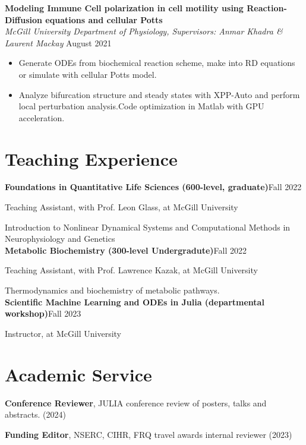 \documentclass{article}
\newcommand{\cvsection}[1]{\section*{\rmfamily#1}}
\begin{document}
\begin{samepage}
\textbf{Modeling Immune Cell polarization in cell motility using Reaction-Diffusion equations and cellular Potts}\\
\indent
\textit{McGill University Department of Physiology, Supervisors: Anmar Khadra \& Laurent Mackay} \hfill August 2021
\begin{itemize}
    \item[] Generate ODEs from biochemical reaction scheme, make into RD equations or simulate with cellular Potts model.
    \item[] Analyze bifurcation structure and steady states with XPP-Auto and perform local perturbation analysis.Code optimization in Matlab with GPU acceleration.
\end{itemize}
\end{samepage}



\cvsection{Teaching Experience}
\indent

\textbf{Foundations in Quantitative Life Sciences (600-level, graduate)}\hfill Fall 2022

\hspace{2em}Teaching Assistant, with Prof. Leon Glass, at McGill University

\hspace{2em}Introduction to Nonlinear Dynamical Systems and Computational Methods in Neurophysiology and Genetics\\

\textbf{Metabolic Biochemistry (300-level Undergradute)}\hfill Fall 2022

\hspace{2em}Teaching Assistant, with Prof. Lawrence Kazak, at McGill University

\hspace{2em} Thermodynamics and biochemistry of metabolic pathways.\\

\textbf{Scientific Machine Learning and ODEs in Julia (departmental workshop)}\hfill Fall 2023

\hspace{2em}Instructor, at McGill University

\cvsection{Academic Service}
\indent

\textbf{Conference Reviewer}, JULIA conference review of posters, talks and abstracts. \hfill (2024)

\textbf{Funding Editor}, NSERC, CIHR, FRQ travel awards internal reviewer \hfill (2023)
\end{document}

